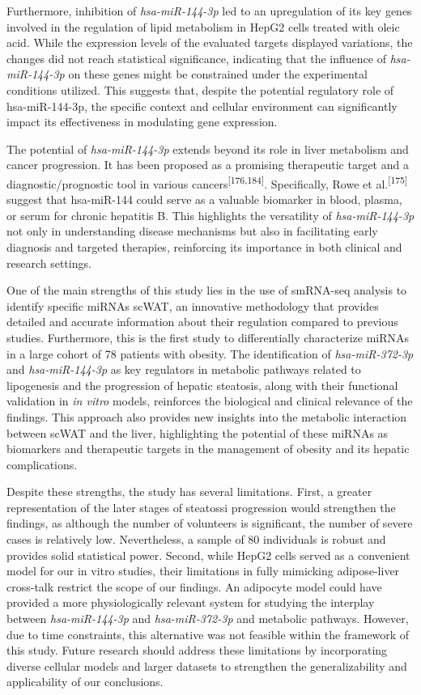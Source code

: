 \documentclass[
  11pt,
  letterpaper,
]{book}
\begin{document}
Furthermore, inhibition of \emph{hsa-miR-144-3p} led to an upregulation
of its key genes involved in the regulation of lipid metabolism in HepG2
cells treated with oleic acid. While the expression levels of the
evaluated targets displayed variations, the changes did not reach
statistical significance, indicating that the influence of
\emph{hsa-miR-144-3p} on these genes might be constrained under the
experimental conditions utilized. This suggests that, despite the
potential regulatory role of hsa-miR-144-3p, the specific context and
cellular environment can significantly impact its effectiveness in
modulating gene expression.

The potential of \emph{hsa-miR-144-3p} extends beyond its role in liver
metabolism and cancer progression. It has been proposed as a promising
therapeutic target and a diagnostic/prognostic tool in various
cancers\textsuperscript{{[}176,184{]}}. Specifically, Rowe et
al.\textsuperscript{{[}175{]}} suggest that hsa-miR-144 could serve as a
valuable biomarker in blood, plasma, or serum for chronic hepatitis B.
This highlights the versatility of \emph{hsa-miR-144-3p} not only in
understanding disease mechanisms but also in facilitating early
diagnosis and targeted therapies, reinforcing its importance in both
clinical and research settings.

One of the main strengths of this study lies in the use of smRNA-seq
analysis to identify specific miRNAs scWAT, an innovative methodology
that provides detailed and accurate information about their regulation
compared to previous studies. Furthermore, this is the first study to
differentially characterize miRNAs in a large cohort of 78 patients with
obesity. The identification of \emph{hsa-miR-372-3p} and
\emph{hsa-miR-144-3p} as key regulators in metabolic pathways related to
lipogenesis and the progression of hepatic steatosis, along with their
functional validation in \emph{in vitro} models, reinforces the
biological and clinical relevance of the findings. This approach also
provides new insights into the metabolic interaction between scWAT and
the liver, highlighting the potential of these miRNAs as biomarkers and
therapeutic targets in the management of obesity and its hepatic
complications.

Despite these strengths, the study has several limitations. First, a
greater representation of the later stages of steatossi progression
would strengthen the findings, as although the number of volunteers is
significant, the number of severe cases is relatively low. Nevertheless,
a sample of 80 individuals is robust and provides solid statistical
power. Second, while HepG2 cells served as a convenient model for our in
vitro studies, their limitations in fully mimicking adipose-liver
cross-talk restrict the scope of our findings. An adipocyte model could
have provided a more physiologically relevant system for studying the
interplay between \emph{hsa-miR-144-3p} and \emph{hsa-miR-372-3p} and
metabolic pathways. However, due to time constraints, this alternative
was not feasible within the framework of this study. Future research
should address these limitations by incorporating diverse cellular
models and larger datasets to strengthen the generalizability and
applicability of our conclusions.
\end{document}
